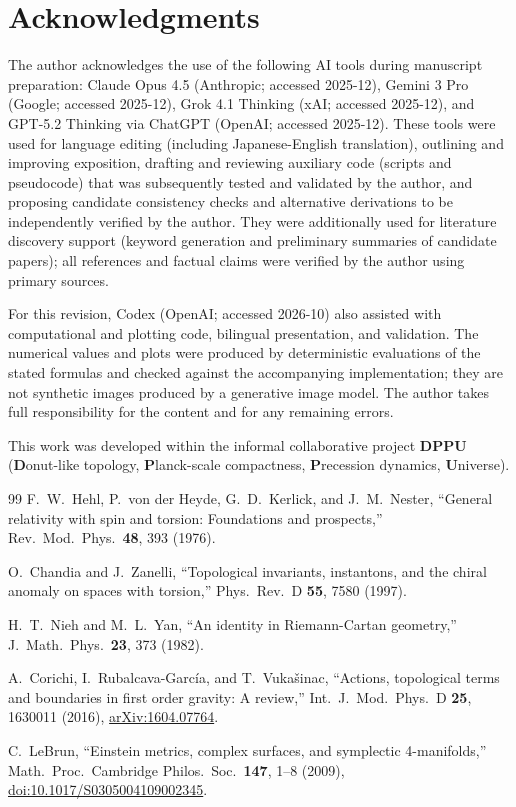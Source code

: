 \documentclass[11pt,a4paper]{article}
\begin{document}
\section*{Acknowledgments}

The author acknowledges the use of the following AI tools during manuscript preparation:
Claude Opus 4.5 (Anthropic; accessed 2025-12), Gemini 3 Pro (Google; accessed 2025-12),
Grok 4.1 Thinking (xAI; accessed 2025-12), and GPT-5.2 Thinking via ChatGPT (OpenAI; accessed 2025-12).
These tools were used for language editing (including Japanese-English translation), outlining and
improving exposition, drafting and reviewing auxiliary code (scripts and pseudocode) that was
subsequently tested and validated by the author, and proposing candidate consistency checks and
alternative derivations to be independently verified by the author.
They were additionally used for literature discovery support (keyword generation and
preliminary summaries of candidate papers);
all references and factual claims were verified by the author using primary sources.

For this revision, Codex (OpenAI; accessed 2026-10) also assisted with
computational and plotting code, bilingual presentation, and validation.
The numerical values and plots were produced by deterministic evaluations
of the stated formulas and checked against the accompanying implementation;
they are not synthetic images produced by a generative image model.
The author takes full responsibility for the content and for any remaining errors.

This work was developed within the informal collaborative project \textbf{DPPU}
(\textbf{D}onut-like topology, \textbf{P}lanck-scale compactness,
\textbf{P}recession dynamics, \textbf{U}niverse).
\begin{thebibliography}{99}
F.~W.~Hehl, P.~von der Heyde, G.~D.~Kerlick, and J.~M.~Nester,
``General relativity with spin and torsion: Foundations and prospects,''
Rev.\ Mod.\ Phys.\ \textbf{48}, 393 (1976).

O.~Chandia and J.~Zanelli,
``Topological invariants, instantons, and the chiral anomaly on spaces with torsion,''
Phys.\ Rev.\ D \textbf{55}, 7580 (1997).

H.~T.~Nieh and M.~L.~Yan,
``An identity in Riemann-Cartan geometry,''
J.\ Math.\ Phys.\ \textbf{23}, 373 (1982).

A.~Corichi, I.~Rubalcava-Garc\'ia, and T.~Vuka\v{s}inac,
``Actions, topological terms and boundaries in first order gravity: A review,''
Int.\ J.\ Mod.\ Phys.\ D \textbf{25}, 1630011 (2016),
\href{https://arxiv.org/abs/1604.07764}{arXiv:1604.07764}.

C.~LeBrun,
``Einstein metrics, complex surfaces, and symplectic 4-manifolds,''
Math.\ Proc.\ Cambridge Philos.\ Soc.\ \textbf{147}, 1--8 (2009),
\href{https://doi.org/10.1017/S0305004109002345}{doi:10.1017/S0305004109002345}.
\end{thebibliography}
\end{document}
